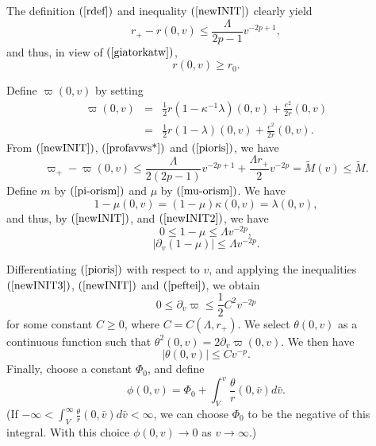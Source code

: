 \documentclass{article}
\begin{document}
The definition $(\ref{rdef})$ and inequality $(\ref{newINIT})$
clearly yield
\begin{equation}
\label{profavws*}
r_+-r(0,v)\le \frac{\Lambda}{2p-1}v^{-2p+1},
\end{equation}
and thus, in view of $(\ref{giatorkatw})$,
\begin{equation}
\label{newINIT4}
r(0,v)\ge r_0.
\end{equation}

Define $\varpi(0,v)$ by setting
\begin{eqnarray}
\label{pioris}
\varpi(0,v)&=&\frac12r(1-\kappa^{-1}\lambda)(0,v)
+\frac{e^2}{2r}(0,v)\\
\nonumber
&=&\frac12r(1-\lambda)(0,v)+\frac{e^2}{2r}(0,v).
\end{eqnarray}
From $(\ref{newINIT})$, $(\ref{profavws*})$ and $(\ref{pioris})$, we have
\begin{equation}
\label{birxi}
\varpi_+-\varpi(0,v)\le
\frac{\Lambda}{2(2p-1)}v^{-2p+1}+
\frac{\Lambda r_+}2v^{-2p}=\tilde{M}(v)\le\tilde{M}.
\end{equation}
Define $m$ by $(\ref{pi-orism})$ and $\mu$ by $(\ref{mu-orism})$. 
We have 
\begin{equation}
\label{exomev}
1-\mu(0,v)=(1-\mu)\kappa(0,v)=\lambda(0,v),
\end{equation}
and thus, by
$(\ref{newINIT})$, and $(\ref{newINIT2})$,
we have
\begin{equation}
\label{exomev3ava}
0\le 1-\mu\le \Lambda v^{-2p},
\end{equation}
\begin{equation}
\label{peftei}
|\partial_v(1-\mu)|\le \Lambda v^{-2p}.
\end{equation}


Differentiating $(\ref{pioris})$ with respect to $v$, and applying the
inequalities
$(\ref{newINIT3})$, $(\ref{newINIT})$ and $(\ref{peftei})$,
we obtain
\begin{equation}
\label{nova}
0\le\partial_v\varpi\le \frac12C^2v^{-2p}
\end{equation}
for some constant $C\ge0$, where $C=C(\Lambda, r_+)$.
We select $\theta(0,v)$ as a continuous
function such that $\theta^2(0,v)=2\partial_v\varpi(0,v)$.
We then have
\begin{equation}
\label{INITv2}
|\theta(0,v)|\le Cv^{-p}.
\end{equation}
Finally, choose a constant $\Phi_0$, and define
\begin{equation}
\label{orise}
\phi(0,v)=\Phi_0+\int_V^v\frac\theta{r}(0,\bar{v})d\bar{v}.
\end{equation}
(If $-\infty<\int_V^\infty\frac\theta{r}(0,\bar{v})d\bar{v}<\infty$,
we can choose $\Phi_0$ to be the negative of this integral.
With this choice $\phi(0,v)\to0$ as $v\to\infty$.)
\end{document}
